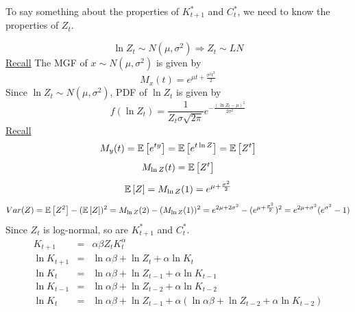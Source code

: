 \documentclass[twoside]{article}
\begin{document}
To say something about the properties of $K^{*}_{t+1}$ and $C^{*}_{t}$, we need to know the properties of $Z_{t}$.

\begin{example}
    \begin{equation}
        \ln Z_{t} \sim N(\mu, \sigma^{2}) \Longrightarrow Z_{t} \sim LN
    \end{equation}
    \underline{Recall} The MGF of $x \sim N(\mu, \sigma^{2})$ is given by 
    \begin{equation}
        M_{x}(t) = e^{\mu t + \frac{\sigma^{2}t^{2}}{2}} 
    \end{equation} 
    Since $\ln Z_{t} \sim N(\mu, \sigma^{2})$, PDF of $\ln Z_{t}$ is given by \begin{equation}
        f(\ln Z_{t}) = \frac{1}{Z_{t} \sigma \sqrt{2\pi}}e^{-\frac{(\ln Z_{t} - \mu)^{2}}{2 \sigma^{2}}}
    \end{equation}
    \underline{Recall} 
    \begin{equation}
        M_{y}(t) = \mathbb{E} \left[ e^{t y} \right] = \mathbb{E} \left[ e^{t \ln Z} \right] = \mathbb{E} \left[ Z^{t} \right] 
    \end{equation}
    \begin{equation}
        M_{\ln Z}(t) = \mathbb{E} \left[ Z^{t} \right] 
    \end{equation}
    \begin{equation}
        \mathbb{E} \left[ Z \right] = M_{\ln Z}(1) = e^{\mu + \frac{\sigma^{2}}{2}}
    \end{equation}
    \begin{equation}
         Var(Z) = \mathbb{E} \left[ Z^{2} \right] - (\mathbb{E} \left[ Z \right])^{2} =  M_{\ln Z}(2) -  (M_{\ln Z}(1))^{2} = e^{2 \mu + 2 \sigma^{2}} - (e^{\mu + \frac{\sigma^{2}}{2}})^{2} = e^{2 \mu + \sigma^{2}} ( e^{\sigma^{2}} - 1)
    \end{equation} 
    Since $Z_{t}$ is log-normal, so are $K^{*}_{t+1}$ and $C^{*}_{t}$.
    \begin{eqnarray}
        K_{t+1} &=& \alpha \beta Z_{t} K^{\alpha}_{t}\\
        \ln K_{t+1} &=& \ln \alpha \beta + \ln Z_{t} + \alpha \ln K_{t}\\
        \ln K_{t} &=& \ln \alpha \beta + \ln Z_{t-1} + \alpha \ln K_{t-1}\\
        \ln K_{t-1} &=& \ln \alpha \beta + \ln Z_{t-2} + \alpha \ln K_{t-2}\\
        \ln K_{t} &=& \ln \alpha \beta + \ln Z_{t-1} + \alpha (\ln \alpha \beta + \ln Z_{t-2} + \alpha \ln K_{t-2})\\

\end{eqnarray}
\end{example}
\end{document}
